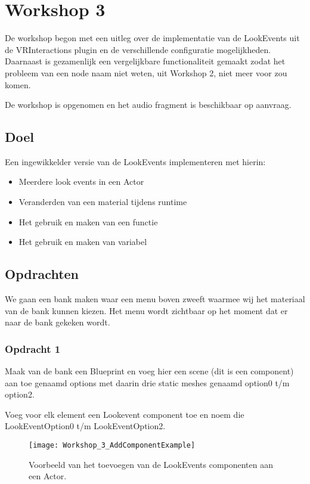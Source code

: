 
\chapter{Workshop 3}
\label{appendix:workshop3}
\lhead{}
De workshop begon met een uitleg over de implementatie van de LookEvents uit de VRInteractions plugin en de verschillende configuratie mogelijkheden. Daarnaast is gezamenlijk een vergelijkbare functionaliteit gemaakt zodat het probleem van een node naam niet weten, uit Workshop 2, niet meer voor zou komen.

De workshop is opgenomen en het audio fragment is beschikbaar op aanvraag.

\section{Doel}
Een ingewikkelder versie van de LookEvents implementeren met hierin:

\begin{itemize}
	\item Meerdere look events in een Actor
	\item Veranderden van een material tijdens runtime
	\item Het gebruik en maken van een functie
	\item Het gebruik en maken van variabel
\end{itemize}

\section{Opdrachten}

We gaan een bank maken waar een menu boven zweeft waarmee wij het materiaal van de bank kunnen kiezen. Het menu wordt zichtbaar op het moment dat er naar de bank gekeken wordt.

\subsection{Opdracht 1}
Maak van de bank een Blueprint en voeg hier een scene (dit is een component) aan toe genaamd options met daarin drie static meshes genaamd option0 t/m option2.

Voeg voor elk element een Lookevent component toe en noem die LookEventOption0 t/m LookEventOption2.

\begin{figure}[!ht]
  \centering
    \texttt{[image: Workshop\_3\_AddComponentExample]}
    \caption{Voorbeeld van het toevoegen van de LookEvents componenten aan een Actor.}
\end{figure}

